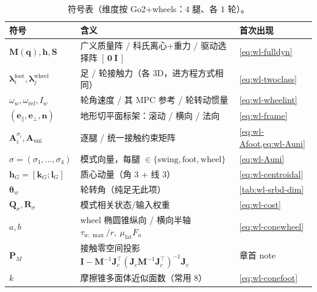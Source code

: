 \begin{table}[H]\centering\small
\caption{符号表（维度按 Go2+wheels：$4$ 腿、各 $1$ 轮）。}
\label{tab:wl-symbols}
\begin{tabular}{lll}
\toprule
符号 & 含义 & 首次出现 \\
\midrule
$\mathbf{M}(\mathbf{q}),\mathbf{h},\mathbf{S}$ & 广义质量阵 / 科氏离心+重力 / 驱动选择阵 $[\,\mathbf{0}\ \mathbf{I}\,]$ & \cref{eq:wl-fulldyn} \\
$\boldsymbol\lambda_i^{\mathrm{foot}},\boldsymbol\lambda_j^{\mathrm{wheel}}$ & 足 / 轮接触力（各 $3$D，进方程方式相同） & \cref{eq:wl-twoclass} \\
$\omega_w,\omega_{\mathrm{ref}},I_w$ & 轮角速度 / 其 MPC 参考 / 轮转动惯量 & \cref{eq:wl-wheelint} \\
$(\mathbf{e}_\parallel,\mathbf{e}_\perp,\mathbf{n})$ & 地形切平面标架：滚动 / 横向 / 法向 & \cref{eq:wl-frame} \\
$\mathbf{A}_i^{\sigma_i},\mathbf{A}_{\mathrm{uni}}$ & 逐腿 / 统一接触约束矩阵 & \cref{eq:wl-Afoot,eq:wl-Auni} \\
$\sigma=(\sigma_1,\dots,\sigma_4)$ & 模式向量，每腿 $\in\{\mathrm{swing},\mathrm{foot},\mathrm{wheel}\}$ & \cref{eq:wl-Auni} \\
$\mathbf{h}_G=[\mathbf{k}_G;\mathbf{l}_G]$ & 质心动量（角 $3$ + 线 $3$） & \cref{eq:wl-centroidal} \\
$\boldsymbol\theta_w$ & 轮转角（纯足无此项） & \cref{tab:wl-srbd-dim} \\
$\mathbf{Q}_\sigma,\mathbf{R}_\sigma$ & 模式相关状态/输入权重 & \cref{eq:wl-cost} \\
$a,b$ & wheel 椭圆锥纵向 / 横向半轴 $\tau_{w,\max}/r,\ \mu_{\mathrm{lat}}F_n$ & \cref{eq:wl-conewheel} \\
$\mathbf{P}_M$ & 接触零空间投影 $\mathbf{I}-\mathbf{M}^{-1}\mathbf{J}_c^\top(\mathbf{J}_c\mathbf{M}^{-1}\mathbf{J}_c^\top)^{-1}\mathbf{J}_c$ & 章首 note \\
$k$ & 摩擦锥多面体近似面数（常用 $8$） & \cref{eq:wl-conefoot} \\
\bottomrule
\end{tabular}
\end{table}

